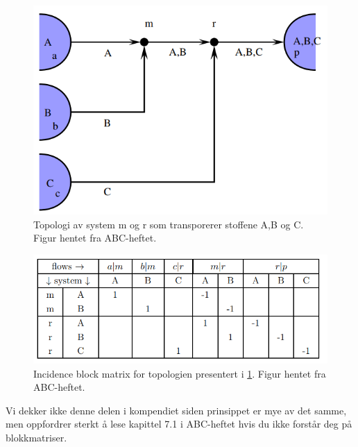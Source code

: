 \begin{figure}[H]
    \centering
    \includegraphics[scale=0.7]{Figures/Block_matrix_topo}
    \caption{Topologi av system m og r som transporerer stoffene A,B og C. Figur hentet fra ABC-heftet.}
    \label{fig:block_matrix1}
\end{figure}

\begin{figure}[H]
    \centering
    \includegraphics[scale=0.7]{Figures/Block_matrix}
    \caption{Incidence block matrix for topologien presentert i  \cref{fig:block_matrix1}. Figur hentet fra ABC-heftet.}
    \label{fig:block_marix}
\end{figure}
Vi dekker ikke denne delen i kompendiet siden prinsippet er mye av det samme, men oppfordrer sterkt å lese kapittel 7.1 i ABC-heftet hvis du ikke forstår deg på blokkmatriser.
